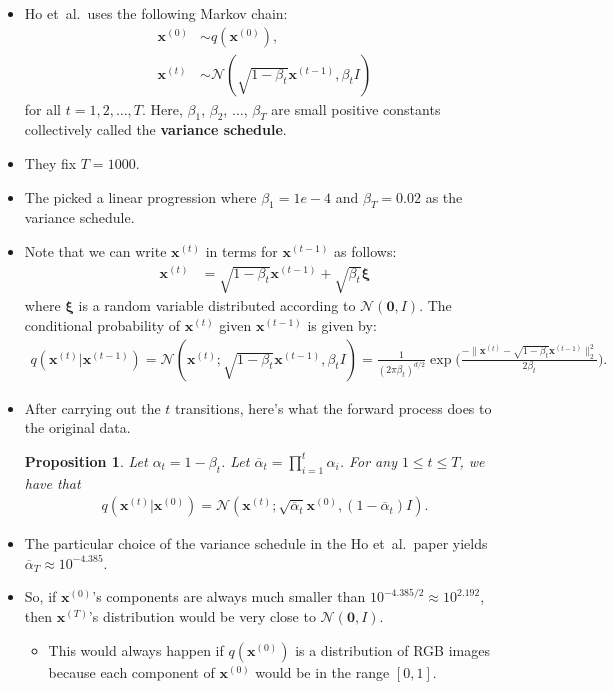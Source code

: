 \documentclass[10pt]{article}
\newtheorem{proposition}[lemma]{Proposition}
\newcommand{\ve}[1]{\mathbf{#1}}
\newcommand{\ves}[1]{\boldsymbol{#1}}
\newcommand{\etal}{{et~al.}}
\newcommand{\mcal}[1]{\mathcal{#1}}
\begin{document}
\begin{itemize}
  \item Ho \etal\ uses the following Markov chain:
  \begin{align*}
    \ve{x}^{(0)} &\sim q(\ve{x}^{(0)}),\\
    \ve{x}^{(t)} &\sim \mcal{N}(\sqrt{1 - \beta_t} \ve{x}^{(t-1)}, \beta_t I)
  \end{align*}
  for all $t = 1, 2, \dotsc, T$. Here, $\beta_1$, $\beta_2$, $\dotsc$, $\beta_T$ are small positive constants collectively called the {\bf variance schedule}.

  \item They fix $T = 1000$.
  
  \item The picked a linear progression where $\beta_1 = 1e-4$ and $\beta_T = 0.02$ as the variance schedule.
  
  \item Note that we can write $\ve{x}^{(t)}$ in terms for $\ve{x}^{(t-1)}$ as follows:
  \begin{align*}
    \ve{x}^{(t)} &= \sqrt{1 - \beta_t} \ve{x}^{(t-1)} + \sqrt{\beta_t} \ves{\xi}
  \end{align*}
  where $\ves{\xi}$ is a random variable distributed according to $\mcal{N}(\ve{0},I)$. The conditional probability of $\ve{x}^{(t)}$ given $\ve{x}^{(t-1)}$ is given by:
  \begin{align*}
    q(\ve{x}^{(t)} | \ve{x}^{(t-1)}) = \mcal{N}(\ve{x}^{(t)}; \sqrt{1 - \beta_t} \ve{x}^{(t-1)}, \beta_t I) = \frac{1}{(2\pi \beta_t)^{d/2}}\exp\bigg( \frac{-\| \ve{x}^{(t)} - \sqrt{1 - \beta_t} \ve{x}^{(t-1)} \|_2^2}{2\beta_t} \bigg).
  \end{align*}

  \item After carrying out the $t$ transitions, here's what the forward process does to the original data.
  \begin{proposition}
    Let $\alpha_t = 1 - \beta_t$. Let $\overline{\alpha}_t = \prod_{i=1}^t \alpha_i$. For any $1 \leq t \leq T$, we have that 
    \begin{align*}
      q(\ve{x}^{(t)}|\ve{x}^{(0)}) = \mcal{N}(\ve{x}^{(t)}; \sqrt{\overline{\alpha}_t} \ve{x}^{(0)}, (1 - \overline{\alpha}_t) I ).
    \end{align*}
  \end{proposition}

  \item The particular choice of the variance schedule in the Ho \etal\ paper yields $\overline{\alpha}_T \approx 10^{-4.385}$. 
  
  \item So, if $\ve{x}^{(0)}$'s components are always much smaller than $10^{-4.385 / 2} \approx 10^{2.192}$, then $\ve{x}^{(T)}$'s distribution would be very close to $\mcal{N}(\ve{0}, I)$.
  \begin{itemize}
    \item This would always happen if $q(\ve{x}^{(0)})$ is a distribution of RGB images because each component of $\ve{x}^{(0)}$ would be in the range $[0,1]$.
  \end{itemize}
\end{itemize}
\end{document}
